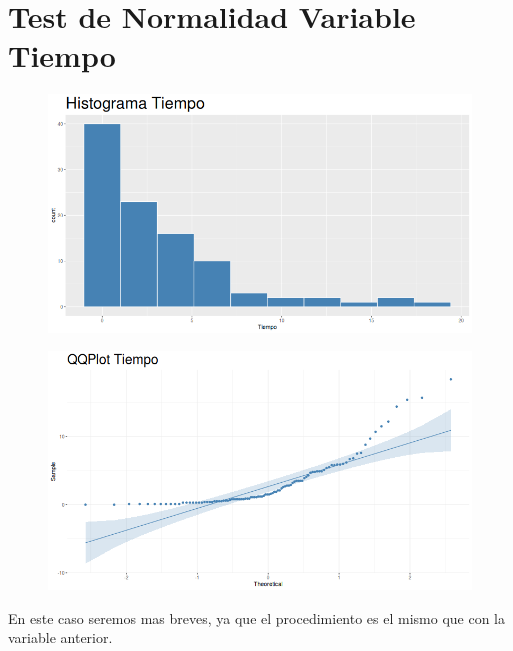 \documentclass{article}
\begin{document}
    \section{Test de Normalidad Variable Tiempo}
    
    \begin{center}
        \begin{minipage}{0.9\linewidth}
            \begin{minipage}{0.45\linewidth}
                \begin{figure}[H]
                    \includegraphics[width=\linewidth]{../hist1.png}
                \end{figure} 
            \end{minipage}
            \hspace{0.05\linewidth} 
            \begin{minipage}{0.45\linewidth}
                \begin{figure}[H]
                    \includegraphics[width=\linewidth]{../qqplot1.png}
                \end{figure} 
            \end{minipage}
        \end{minipage}
    \end{center}
    En este caso seremos mas breves, ya que el procedimiento es el mismo que con la variable anterior.
    
\end{document}
